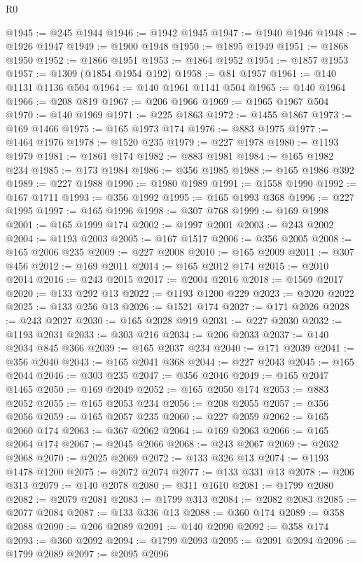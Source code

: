 \begin{lexlean}{R0}
\begin{coremodule}
@1945 := @245 @1944
@1946 := @1942 @1945
@1947 := @1940 @1946
@1948 := @1926 @1947
@1949 := @1900 @1948
@1950 := @1895 @1949
@1951 := @1868 @1950
@1952 := @1866 @1951
@1953 := @1864 @1952
@1954 := @1857 @1953
@1957 := @1309 (@1854 @1954 @192)
@1958 := @81 @1957
@1961 := @140 @1131 @1136 @504
@1964 := @140 @1961 @1141 @504
@1965 := @140 @1964
@1966 := @208 @819
@1967 := @206 @1966
@1969 := @1965 @1967 @504
@1970 := @140 @1969
@1971 := @225 @1863
@1972 := @1455 @1867
@1973 := @169 @1466
@1975 := @165 @1973 @174
@1976 := @883 @1975
@1977 := @1464 @1976
@1978 := @1520 @235
@1979 := @227 @1978
@1980 := @1193 @1979
@1981 := @1861 @174
@1982 := @883 @1981
@1984 := @165 @1982 @234
@1985 := @173 @1984
@1986 := @356 @1985
@1988 := @165 @1986 @392
@1989 := @227 @1988
@1990 := @1980 @1989
@1991 := @1558 @1990
@1992 := @167 @1711
@1993 := @356 @1992
@1995 := @165 @1993 @368
@1996 := @227 @1995
@1997 := @165 @1996
@1998 := @307 @768
@1999 := @169 @1998
@2001 := @165 @1999 @174
@2002 := @1997 @2001
@2003 := @243 @2002
@2004 := @1193 @2003
@2005 := @167 @1517
@2006 := @356 @2005
@2008 := @165 @2006 @235
@2009 := @227 @2008
@2010 := @165 @2009
@2011 := @307 @456
@2012 := @169 @2011
@2014 := @165 @2012 @174
@2015 := @2010 @2014
@2016 := @243 @2015
@2017 := @2004 @2016
@2018 := @1569 @2017
@2020 := @133 @292 @13
@2022 := @1193 @1200 @229
@2023 := @2020 @2022
@2025 := @133 @256 @13
@2026 := @1521 @174
@2027 := @171 @2026
@2028 := @243 @2027
@2030 := @165 @2028 @919
@2031 := @227 @2030
@2032 := @1193 @2031
@2033 := @303 @216
@2034 := @206 @2033
@2037 := @140 @2034 @845 @366
@2039 := @165 @2037 @234
@2040 := @171 @2039
@2041 := @356 @2040
@2043 := @165 @2041 @368
@2044 := @227 @2043
@2045 := @165 @2044
@2046 := @303 @235
@2047 := @356 @2046
@2049 := @165 @2047 @1465
@2050 := @169 @2049
@2052 := @165 @2050 @174
@2053 := @883 @2052
@2055 := @165 @2053 @234
@2056 := @208 @2055
@2057 := @356 @2056
@2059 := @165 @2057 @235
@2060 := @227 @2059
@2062 := @165 @2060 @174
@2063 := @367 @2062
@2064 := @169 @2063
@2066 := @165 @2064 @174
@2067 := @2045 @2066
@2068 := @243 @2067
@2069 := @2032 @2068
@2070 := @2025 @2069
@2072 := @133 @326 @13
@2074 := @1193 @1478 @1200
@2075 := @2072 @2074
@2077 := @133 @331 @13
@2078 := @206 @313
@2079 := @140 @2078
@2080 := @311 @1610
@2081 := @1799 @2080
@2082 := @2079 @2081
@2083 := @1799 @313
@2084 := @2082 @2083
@2085 := @2077 @2084
@2087 := @133 @336 @13
@2088 := @360 @174
@2089 := @358 @2088
@2090 := @206 @2089
@2091 := @140 @2090
@2092 := @358 @174
@2093 := @360 @2092
@2094 := @1799 @2093
@2095 := @2091 @2094
@2096 := @1799 @2089
@2097 := @2095 @2096

\end{coremodule}
\end{lexlean}
